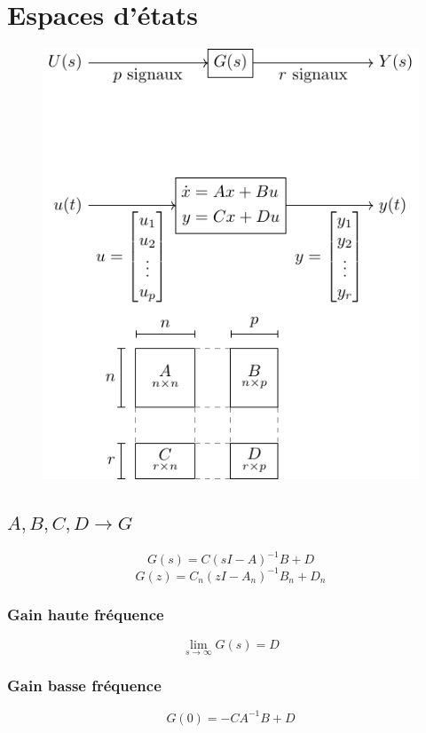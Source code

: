 \documentclass[resume]{subfiles}
\begin{document}
\section{Espaces d'états}
\begin{figure}[H]
\centering
\includegraphics[scale=1,page=1]{drwg_0.pdf}
\end{figure}
\subsection{$A,B,C,D \longrightarrow G$}
$$G(s)=C(sI-A)^{-1}B+D$$
$$G(z)=C_n(zI-A_n)^{-1}B_n+D_n$$
\subsubsection{Gain haute fréquence}
$$\lim_{s\to\infty}G(s)=D$$
\subsubsection{Gain basse fréquence}
$$G(0)=-CA^{-1}B+D$$
\end{document}
